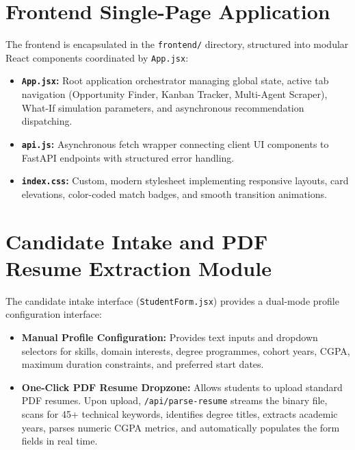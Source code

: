 \section{Frontend Single-Page Application} \label{S5.3}
The frontend is encapsulated in the \texttt{frontend/} directory, structured into modular React components coordinated by \texttt{App.jsx}:
\begin{itemize}
	\item \textbf{\texttt{App.jsx}:} Root application orchestrator managing global state, active tab navigation (Opportunity Finder, Kanban Tracker, Multi-Agent Scraper), What-If simulation parameters, and asynchronous recommendation dispatching.
	\item \textbf{\texttt{api.js}:} Asynchronous fetch wrapper connecting client UI components to FastAPI endpoints with structured error handling.
	\item \textbf{\texttt{index.css}:} Custom, modern stylesheet implementing responsive layouts, card elevations, color-coded match badges, and smooth transition animations.
\end{itemize}

\section{Candidate Intake and PDF Resume Extraction Module} \label{S5.4}
The candidate intake interface (\texttt{StudentForm.jsx}) provides a dual-mode profile configuration interface:
\begin{itemize}
	\item \textbf{Manual Profile Configuration:} Provides text inputs and dropdown selectors for skills, domain interests, degree programmes, cohort years, CGPA, maximum duration constraints, and preferred start dates.
	\item \textbf{One-Click PDF Resume Dropzone:} Allows students to upload standard PDF resumes. Upon upload, \texttt{/api/parse-resume} streams the binary file, scans for 45+ technical keywords, identifies degree titles, extracts academic years, parses numeric CGPA metrics, and automatically populates the form fields in real time.
\end{itemize}

